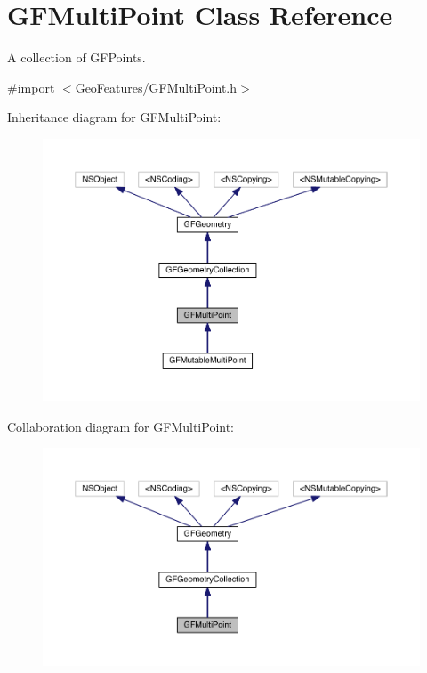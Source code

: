 \hypertarget{interface_g_f_multi_point}{}\section{G\+F\+Multi\+Point Class Reference}
\label{interface_g_f_multi_point}


A collection of G\+F\+Points.  




{\ttfamily \#import $<$Geo\+Features/\+G\+F\+Multi\+Point.\+h$>$}



Inheritance diagram for G\+F\+Multi\+Point\+:
\nopagebreak
\begin{figure}[H]
\begin{center}
\leavevmode
\includegraphics[width=350pt]{interface_g_f_multi_point__inherit__graph}
\end{center}
\end{figure}


Collaboration diagram for G\+F\+Multi\+Point\+:
\nopagebreak
\begin{figure}[H]
\begin{center}
\leavevmode
\includegraphics[width=350pt]{interface_g_f_multi_point__coll__graph}
\end{center}
\end{figure}
